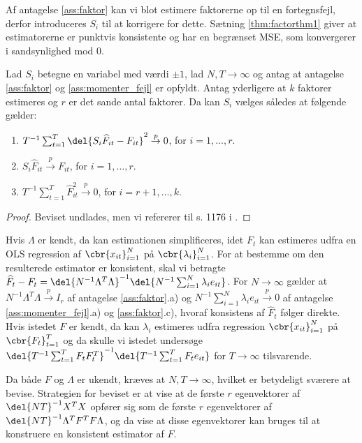 Af antagelse \ref{ass:faktor} kan vi blot estimere faktorerne op til en fortegnsfejl, derfor introduceres  \(S_i\) til at korrigere for dette.
Sætning \ref{thm:factorthm1} giver at estimatorerne er punktvis konsistente og har en begrænset MSE, som konvergerer i sandsynlighed mod 0.
%
\begin{thm} \label{thm:factorthm1}
Lad \(S_i\) betegne en variabel med værdi \(\pm 1\), lad \(N, T \rightarrow \infty\) og antag at antagelse \ref{ass:faktor} og \ref{ass:momenter_fejl} er opfyldt.
Antag yderligere at \(k\) faktorer estimeres og \(r\) er det sande antal faktorer.
Da kan \(S_i\) vælges således at følgende gælder:
\begin{enumerate}
\item \(T^{-1} \sum_{t=1}^T \del{S_i \widehat{F}_{it} - F_{it}}^2 \overset{p}{\rightarrow} 0\), for \(i=1, \ldots, r\).
\item \(S_i \widehat{F}_{it} \overset{p}{\rightarrow} F_{it}\), for \(i=1, \ldots, r\).
\item \(T^{-1} \sum_{t=1}^T \widehat{F}_{it}^2 \overset{p}{\rightarrow} 0\), for \(i=r+1, \ldots, k\).
\end{enumerate}
\end{thm}
%
\begin{proof}
Beviset undlades, men vi refererer til s. 1176 i \citep{stock_watson_2002a}.
\end{proof}
%
Hvis \(\Lambda\) er kendt, da kan estimationen simplificeres, idet \(F_t\)  kan estimeres udfra en OLS regression af \(\cbr{x_{it}}_{i=1}^N\) på \(\cbr{\lambda_i}_{i=1}^N\).
For at bestemme om den resulterede estimator er konsistent, skal vi betragte \(\widehat{F}_t - F_t = \del{N^{-1} \Lambda^T \Lambda}^{-1} \del{N^{-1} \sum_{i=1}^N \lambda_i e_{it}}\).
For \(N \rightarrow \infty\) gælder at \(N^{-1} \Lambda^T \Lambda \overset{p}{\rightarrow} I_r\) af antagelse \ref{ass:faktor}.a) og \(N^{-1} \sum_{i=1}^N \lambda_i e_{it} \overset{p}{\rightarrow} 0\) af antagelse \ref{ass:momenter_fejl}.a) og \ref{ass:faktor}.c), hvoraf konsistens af \(\widehat{F}_t\) følger direkte.
Hvis istedet \(F\) er kendt, da kan \(\lambda_i\) estimeres udfra regression \(\cbr{x_{it}}_{i=1}^N\) på \(\cbr{F_{t}}_{t=1}^T\) og da skulle vi istedet undersøge \(\del{T^{-1} \sum_{t=1}^T F_t F_t^T}^{-1} \del{T^{-1} \sum_{t=1}^T F_t e_{it}}\) for \(T \rightarrow \infty\) tilsvarende.

Da både \(F\) og \(\Lambda\) er ukendt, kræves at \(N, T \rightarrow \infty\), hvilket er betydeligt sværere at bevise.
Strategien for beviset er at vise at de første \(r\) egenvektorer af \(\del{NT}^{-1} X^T X\) opfører sig som de første \(r\) egenvektorer af \(\del{NT}^{-1} \Lambda^T F^T F \Lambda\), og da vise at disse egenvektorer kan bruges til at konstruere en konsistent estimator af \(F\).

